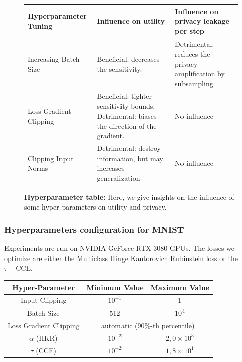 \begin{figure}
    \centering
        \begin{tabular}{|p{3.5cm}|p{5.5cm}p{5cm}|}
        \hline
        \textbf{Hyperparameter \newline Tuning} & \textbf{Influence on utility} & \textbf{Influence on privacy \newline leakage per step} \\
        \hline
        \hline
        Increasing Batch Size & Beneficial: decreases the sensitivity. & Detrimental: reduces the privacy amplification by subsampling. \\
        \hline
        Loss Gradient Clipping & Beneficial: tighter sensitivity bounds. \newline Detrimental: biases the direction of the gradient. & No influence \\
        \hline
        Clipping Input Norms & Detrimental: destroy information, but may increases generalization & No influence \\
        \hline
        \end{tabular}


    \caption{\textbf{Hyperparameter table:} Here, we give insights on the influence of some hyper-parameters on utility and privacy.}
    \label{fig:hyperparams}
\end{figure}

\subsubsection{Hyperparameters configuration for MNIST}

 Experiments are run on NVIDIA GeForce RTX 3080 GPUs. The losses we optimize are either the Multiclass Hinge Kantorovich Rubinstein loss or the $\tau-\text{CCE}$. 

\begin{center}
\begin{tabular}{|c c c|} 
 \hline
 Hyper-Parameter & Minimum Value & Maximum Value \\ [0.5ex] 
 \hline\hline
 Input Clipping & $10^{-1}$ & 1 \\ 
 \hline
 Batch Size & 512 & $10^4$ \\
 \hline
 Loss Gradient Clipping & \multicolumn{2}{c|}{automatic (90\%-th percentile)} \\
 \hline
 $\alpha$ (HKR) & $10^{-2}$ & $2,0 \times 10^3$ \\
 \hline
 $\tau$ (CCE) & $10^{-2}$ & $1,8 \times 10^{1}$ \\
 \hline
\end{tabular}
\end{center}

